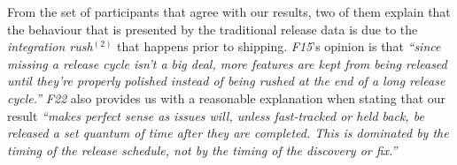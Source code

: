 From the set of participants that agree with our results, two of them explain
that the behaviour that is presented by the traditional release data is due to
the {\em integration rush}$^{(2)}$ that happens prior to shipping. {\em F15}'s
opinion is that {\em ``since missing a release cycle isn't a big deal, more
features are kept from being released until they're properly polished instead of
being rushed at the end of a long release cycle.''} {\em F22} also provides us
with a reasonable explanation when stating that our result {\em ``makes perfect
	sense as issues will, unless fast-tracked or held back, be released a
	set quantum of time after they are completed. This is dominated by the
	timing of the release schedule, not by the timing of the discovery or
fix.''}\\


